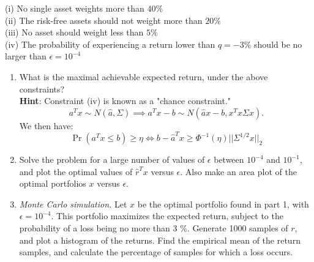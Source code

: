 \documentclass[11pt]{article}
\begin{document}
(i) No single asset weights more than $40\%$ \\
(ii) The risk-free assets should not weight more than $20\%$ \\
(iii) No asset should weight less than $5\%$ \\
(iv) The probability of experiencing a return lower than $q = -3\%$ should be no larger than $\epsilon = 10^{-4}$
\begin{enumerate}
\item
What is the maximal achievable expected return, under the above constraints? \\

\textbf{Hint}: Constraint (iv) is known as a "chance constraint."
\[
a^Tx \sim N(\hat{a}, \Sigma) \implies a^Tx - b \sim N(\hat{a}x - b, x^Tx\Sigma x).
\]
We then have:
\[\Pr(a^Tx \leq b) \geq \eta \iff b - \hat{a}^Tx \geq \Phi^{-1}(\eta)||\Sigma^{1/2}x||_2
\]

\item Solve the problem for a large number of values of $\epsilon$ between $10^{-4}$ and $10^{-1}$, and plot the optimal values of $\hat{r}^Tx$ versus $\epsilon$. Also make an area plot of the optimal portfolios $x$ versus $\epsilon$.

\item \textit{Monte Carlo simulation.} Let $x$ be the optimal portfolio found in part 1, with $\epsilon=10^{-4}$. This portfolio maximizes the expected return, subject to the probability of a loss being no more than 3 $\%$. Generate 1000 samples of $r$, and plot a histogram of the returns. Find the empirical mean of the return samples, and calculate the percentage of samples for which a loss occurs.

\end{enumerate}
\end{document}
